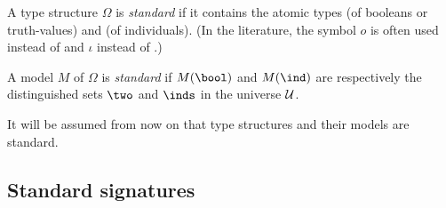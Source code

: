 A type structure $\Omega$ is {\em standard\/} if it contains the
atomic types  (of booleans or truth-values) and  (of
individuals).  (In the literature, the  symbol  $o$ is  often used 
instead of   and $\iota$ instead of .)

A model $M$ of $\Omega$ is {\em standard\/} if $M(\bool)$ and $M(\ind)$ are
respectively the distinguished sets $\two$ and $\inds$ in the universe
$\cal U$. 

It will be assumed from now on that type structures and their models
are standard.

\subsection{Standard signatures}
\label{standard-signatures}


